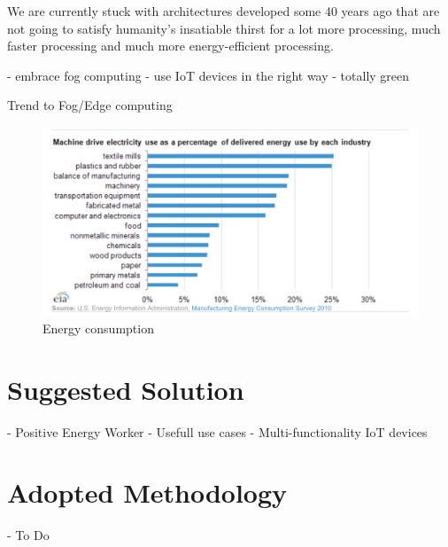   We are currently stuck with architectures developed some 40 years ago that are not going to
  satisfy humanity’s insatiable thirst for a lot more processing, much faster processing and
  much more energy-efficient processing.

  - embrace fog computing
  - use IoT devices in the right way
  - totally green

  Trend to Fog/Edge computing

  \begin{figure}[!h]\centering
    \includegraphics[width=.8\columnwidth]{2.0-Context/figs/Energy-consumption-graph.png}
    \caption{Energy consumption}
    \label{Energy-consumption-graph}
  \end{figure}


\section{Suggested Solution}
  - Positive Energy Worker
  - Usefull use cases
  - Multi-functionality IoT devices

\section{Adopted Methodology}
  - To Do

\clearpage